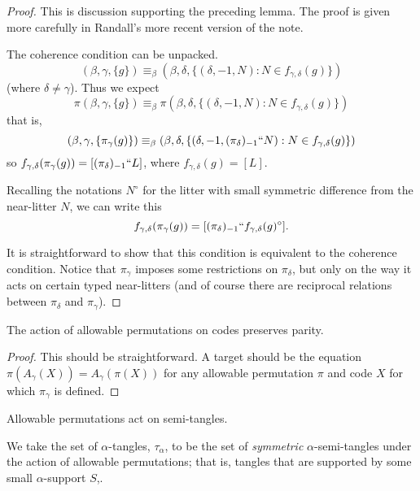\begin{proof}
\leanok
This is discussion supporting the preceding lemma. The proof is given more carefully in Randall’s more recent version of the note.

The coherence condition can be unpacked.
$$(\beta,\gamma,\{g\}) \equiv_\beta (\beta,\delta,\{(\delta,-1,N):N \in f_{\gamma,\delta}(g)\})$$(where $\delta\neq \gamma$).  Thus we expect
$$\pi(\beta,\gamma,\{g\}) \equiv_\beta \pi(\beta,\delta,\{(\delta,-1,N):N \in f_{\gamma,\delta}(g)\})$$
that is,
$$(\beta,\gamma,\{\pi_\gamma(g)\}) \equiv_\beta (\beta,\delta,\{(\delta,-1,(\pi_\delta)_{-1}``N):N \in f_{\gamma,\delta}(g)\})$$
so $f_{\gamma,\delta}(\pi_\gamma(g)) = [(\pi_\delta)_{-1}``L]$, where $f_{\gamma,\delta}(g)=[L]$.

Recalling the notations $N^\circ$ for the litter with small symmetric difference from the near-litter $N$, we can write this $$f_{\gamma,\delta}(\pi_\gamma(g)) = [(\pi_\delta)_{-1}``f_{\gamma,\delta}(g)^\circ].$$

It is straightforward to show that this condition is equivalent to the coherence condition.  Notice that $\pi_\gamma$ imposes some restrictions on $\pi_\delta$, but only on the way it acts on certain typed near-litters (and of course there are reciprocal relations between $\pi_\delta$ and $\pi_\gamma$).
\end{proof}

\begin{lemma}
\label{lem:parity-action}
\leanok
The action of allowable permutations on codes preserves parity.
\end{lemma}
\begin{proof}
\leanok
This should be straightforward.  A target should be the equation $\pi(A_\gamma(X)) = A_\gamma(\pi(X))$ for any allowable permutation $\pi$ and code $X$ for which $\pi_\gamma$ is defined.
\end{proof}

\begin{definition}
\label{def:semi-tangle-action}
  Allowable permutations act on semi-tangles.
\end{definition}

\begin{definition}
\label{def:tangle}
\leanok
We take the set of $\alpha$-tangles, $\tau_\alpha$, to be the set of \emph{symmetric} $\alpha$-semi-tangles under the action of allowable permutations; that is, tangles that are supported by some small $\alpha$-support $S$,.
\end{definition}

